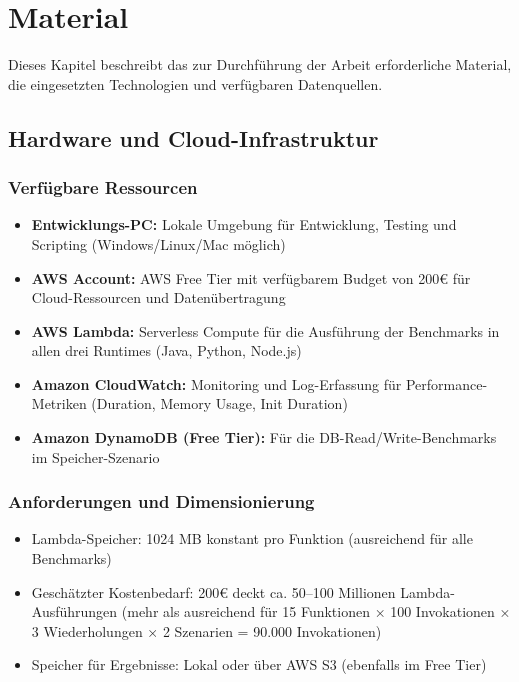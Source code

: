 \chapter{Material}
\label{ch:chapter08}

Dieses Kapitel beschreibt das zur Durchführung der Arbeit erforderliche Material, die eingesetzten Technologien und verfügbaren Datenquellen.
\section{Hardware und Cloud-Infrastruktur}

\subsection{Verfügbare Ressourcen}

\begin{itemize}
    \item \textbf{Entwicklungs-PC:} Lokale Umgebung für Entwicklung, Testing und Scripting (Windows/Linux/Mac möglich)
    \item \textbf{AWS Account:} AWS Free Tier mit verfügbarem Budget von 200€ für Cloud-Ressourcen und Datenübertragung
    \item \textbf{AWS Lambda:} Serverless Compute für die Ausführung der Benchmarks in allen drei Runtimes (Java, Python, Node.js)
    \item \textbf{Amazon CloudWatch:} Monitoring und Log-Erfassung für Performance-Metriken (Duration, Memory Usage, Init Duration)
    \item \textbf{Amazon DynamoDB (Free Tier):} Für die DB-Read/Write-Benchmarks im Speicher-Szenario
\end{itemize}

\subsection{Anforderungen und Dimensionierung}

\begin{itemize}
    \item Lambda-Speicher: 1024 MB konstant pro Funktion (ausreichend für alle Benchmarks)
    \item Geschätzter Kostenbedarf: 200€ deckt ca. 50–100 Millionen Lambda-Ausführungen (mehr als ausreichend für 15 Funktionen × 100 Invokationen × 3 Wiederholungen × 2 Szenarien = 90.000 Invokationen)
    \item Speicher für Ergebnisse: Lokal oder über AWS S3 (ebenfalls im Free Tier)
\end{itemize}

